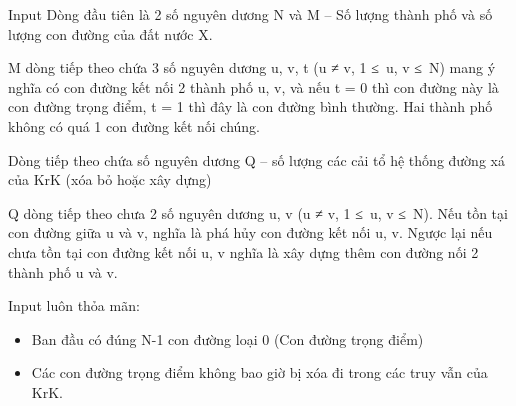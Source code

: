 Input
Dòng đầu tiên là 2 số nguyên dương N và M – Số lượng thành phố và số lượng con đường của đất nước X.  

   M dòng tiếp theo chứa 3 số nguyên dương u, v, t (u ≠ v, 1 ≤ u, v ≤ N) mang ý nghĩa có con đường kết nối 2 thành phố u, v, và nếu t = 0 thì con đường này là con đường trọng điểm, t = 1 thì đây là con đường bình thường. Hai thành phố không có quá 1 con đường kết nối chúng.  

   Dòng tiếp theo chứa số nguyên dương Q – số lượng các cải tổ hệ thống đường xá của KrK (xóa bỏ hoặc xây dựng)  

   Q dòng tiếp theo chưa 2 số nguyên dương u, v (u ≠ v, 1 ≤ u, v ≤ N). Nếu tồn tại con đường giữa u và v, nghĩa là phá hủy con đường kết nối u, v. Ngược lại nếu chưa tồn tại con đường kết nối u, v nghĩa là xây dựng thêm con đường nối 2 thành phố u và v.  

   Input luôn thỏa mãn:  
\begin{itemize}
	\item     Ban đầu có đúng N-1 con đường loại 0 (Con đường trọng điểm)   
	\item     Các con đường trọng điểm không bao giờ bị xóa đi trong các truy vẫn của KrK.   
\end{itemize}